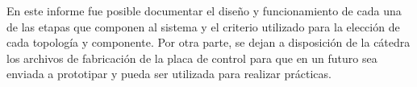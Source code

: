 En este informe fue posible documentar el diseño y funcionamiento de cada una de las etapas que componen al sistema y el criterio utilizado para la elección de cada topología y componente. Por otra parte, se dejan a disposición de la cátedra  los archivos de fabricación de la placa de control para que en un futuro sea enviada  a prototipar y pueda ser utilizada para realizar prácticas.

